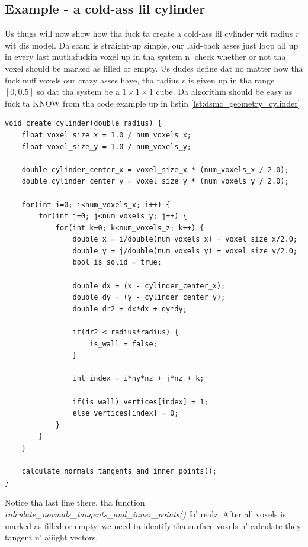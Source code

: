 \subsection{Example - a cold-ass lil cylinder}
Us thugs will now show how tha fuck ta create a cold-ass lil cylinder wit radius $r$ wit dis model. Da scam is straight-up simple, our laid-back asses just loop all up in every last muthafuckin voxel up in tha system n' check whether or not tha voxel should be marked as filled or empty. Us dudes define dat no matter how tha fuck nuff voxels our crazy asses have, tha radius $r$ is given up in tha range $[0, 0.5]$ so dat tha system be a $1\times 1\times 1$ cube. Da algorithm should be easy as fuck  ta KNOW from tha code example up in listin \ref{lst:dsmc_geometry_cylinder}.
\begin{lstlisting}[caption=An example showin how tha fuck ta create a cold-ass lil cylinder., label=lst:dsmc_geometry_cylinder]
void create_cylinder(double radius) {
	float voxel_size_x = 1.0 / num_voxels_x;
	float voxel_size_y = 1.0 / num_voxels_y;

	double cylinder_center_x = voxel_size_x * (num_voxels_x / 2.0);
	double cylinder_center_y = voxel_size_y * (num_voxels_y / 2.0);

	for(int i=0; i<num_voxels_x; i++) {
	    for(int j=0; j<num_voxels_y; j++) {
	        for(int k=0; k<num_voxels_z; k++) {
	            double x = i/double(num_voxels_x) + voxel_size_x/2.0;
	            double y = j/double(num_voxels_y) + voxel_size_y/2.0;
	            bool is_solid = true;

	            double dx = (x - cylinder_center_x);
	            double dy = (y - cylinder_center_y);
	            double dr2 = dx*dx + dy*dy;

	            if(dr2 < radius*radius) {
	                is_wall = false;
	            }

	            int index = i*ny*nz + j*nz + k;

	            if(is_wall) vertices[index] = 1;
	            else vertices[index] = 0;
	        }
	    }
	}

	calculate_normals_tangents_and_inner_points();
}
\end{lstlisting}
Notice tha last line there, tha function \textit{calculate\_normals\_tangents\_and\_inner\_points()} fo' realz. After all voxels is marked as filled or empty, we need ta identify tha surface voxels n' calculate they tangent n' aiiight vectors.
